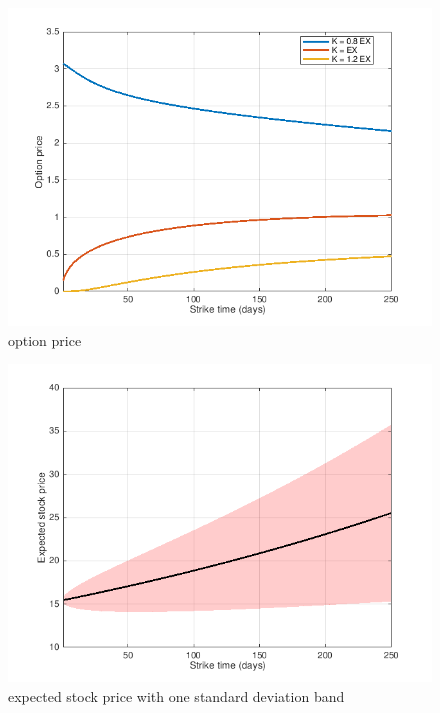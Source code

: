 \documentclass{cisXXX} %
\begin{document}
\begin{figure}
  \includegraphics[width=\linewidth]{H1.png}
\caption{ option price } 
  \label{fig:H1}
\end{figure}

\begin{figure}
  \includegraphics[width=\linewidth]{H2.png}
\caption{expected stock price with one standard deviation band} 
  \label{fig:H2}
\end{figure}
\end{document}
